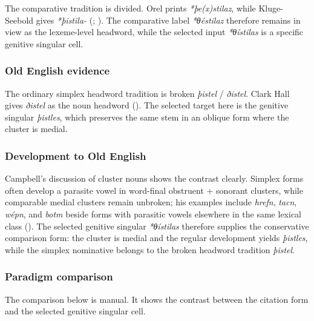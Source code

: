 \documentclass[
  british,
  a4paper,
]{article}
\begin{document}
The comparative tradition is divided. Orel prints \emph{*þe(x)stilaz},
while Kluge-Seebold gives \emph{*þistila-} (; ). The
comparative label \emph{*θéstilaz} therefore remains in view as the
lexeme-level headword, while the selected input \emph{*θístilas} is a
specific genitive singular cell.

\subsubsection{Old English evidence}\label{old-english-evidence-4}

The ordinary simplex headword tradition is broken \emph{þistel} /
\emph{ðistel}. Clark Hall gives \emph{ðistel} as the noun headword
(). The selected
target here is the genitive singular \emph{þistles}, which preserves the
same stem in an oblique form where the cluster is medial.

\subsubsection{Development to Old
English}\label{development-to-old-english-4}

Campbell's discussion of cluster nouns shows the contrast clearly.
Simplex forms often develop a parasite vowel in word-final obstruent +
sonorant clusters, while comparable medial clusters remain unbroken; his
examples include \emph{hrefn}, \emph{tacn}, \emph{wépn}, and \emph{botm}
beside forms with parasitic vowels elsewhere in the same lexical class
(). The selected genitive
singular \emph{*θístilas} therefore supplies the conservative comparison
form: the cluster is medial and the regular development yields
\emph{þistles}, while the simplex nominative belongs to the broken
headword tradition \emph{þistel}.

\subsubsection{Paradigm comparison}\label{paradigm-comparison-1}

The comparison below is manual. It shows the contrast between the
citation form and the selected genitive singular cell.
\end{document}
